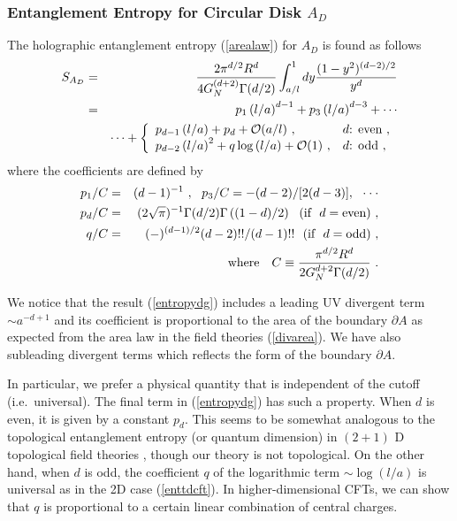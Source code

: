 \documentclass[12pt]{article}
\def\frac#1#2{{#1\over #2}}
\def\s{\sqrt}
\def\de{\partial}
\def\f {\frac}
\def\ddd{\cdot\cdot\cdot}
\def\no{\nonumber \\}
\def\frac#1#2{{#1\over #2}}
\def\s{\sqrt}
\def\ba{\begin{eqnarray}}
\def\ea{\end{eqnarray}}
\begin{document}
\subsubsection{Entanglement Entropy for Circular Disk $A_D$}
\label{EE for A_D}
\hspace{5mm}
The holographic entanglement entropy (\ref{arealaw}) for $A_D$ is found as follows \cite{RuTaL}
\begin{eqnarray}
S_{A_{D}} &=&
\f{2\pi^{d/2}R^d}{4G^{(d+2)}_{N}\Gamma(d/2)}
\int^1_{a/l}dy \f{(1-y^2)^{(d-2)/2}}{y^d}  \nonumber \\
&=&
  p_1  \left(l/a\right)^{d-1}
+ p_3 \left(l/a \right)^{d-3}
+\cdots  \label{areatwo}  \\
&&
\cdots +\left\{
\begin{array}{ll}
\displaystyle p_{d-1}\left(l/a\right) + p_d + \mathcal{O}(a/l) \ , &
 \mbox{$d$: even} \ ,   \\
\displaystyle p_{d-2} \left(l/a\right)^{2} + q \log
\left(l/a\right)+ \mathcal{O}(1) \ ,
&  \mbox{$d$: odd} \ ,   \\
\end{array}
\right.
 \nonumber
\end{eqnarray}
where the coefficients are defined by \ba p_1/C &=& (d-1)^{-1} \ ,\ \
p_3/C = - (d-2)/[2(d-3)],\ \ \ddd \no p_d/C &=&
(2\s{\pi})^{-1}\Gamma(d/2) \Gamma\left((1-d)/2\right) \ \
(\mbox{if}\ \  d=\mbox{even}) \ ,\no q/C &=&
(-)^{(d-1)/2}(d-2)!!/(d-1)!! \ \  (\mbox{if}\ \  d=\mbox{odd}) \ ,
\no
&&\mbox{where}\ \ \  C\equiv
\f{\pi^{d/2}R^d}{2G^{d+2}_{N}\Gamma(d/2)} \ .  \label{entropydg}\ea

We notice that the result (\ref{entropydg}) includes a leading UV
divergent term $\sim a^{-d+1}$ and its coefficient
 is proportional to the area of the boundary $\de A$ as expected from
the area law \cite{Bombelli,Srednicki} in the field theories
(\ref{divarea}). We have also subleading divergent terms which
reflects the form of the boundary $\de A$.

In particular, we prefer a physical quantity that is independent of
the cutoff (i.e.~universal). The final term in (\ref{entropydg}) has
such a property. When $d$ is even, it is given by a constant $p_d$.
This seems to be somewhat analogous to the topological entanglement
entropy (or quantum dimension) in $(2+1)$ D
topological field theories \cite{Kitaev05, Levin05}, though our
theory is not topological.
On the other hand, when $d$ is odd, the coefficient $q$ of the
logarithmic term $\sim \log(l/a)$ is universal as
in the 2D
case (\ref{enttdcft}). In higher-dimensional CFTs, we can show that
$q$ is proportional to a certain linear combination of central charges.
\end{document}
